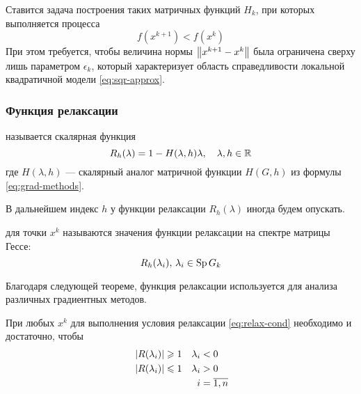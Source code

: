 Ставится задача построения таких матричных функций $H_k$, при которых
выполняется  процесса
\begin{equation}
  \label{eq:relax-cond}
  f(x^{k+1}) < f(x^k)
\end{equation}
При этом требуется, чтобы величина нормы $\left \lVert{x^{k+1}-x^{k}}\right \rVert$ была
ограничена сверху лишь параметром $\epsilon_k$, который характеризует
область справедливости локальной квадратичной модели
\eqref{eq:sqr-approx}.

\subsubsection{Функция релаксации}

\begin{dfn}
   называется скалярная функция
  \begin{equation}
    \label{eq:relax-fun}
    R_h(\lambda) = 1 - H(\lambda, h)\lambda,\quad \lambda,h \in \mathbb{R}
  \end{equation}
  где $H(\lambda, h)$ — скалярный аналог матричной функции $H(G, h)$
  из формулы \eqref{eq:grad-methods}.
\end{dfn}
В дальнейшем индекс $h$ у функции релаксации $R_h(\lambda)$ иногда
будем опускать.

\begin{dfn}
   для точки $x^k$ называются значения
  функции релаксации на спектре матрицы Гессе:
  \begin{equation}
    \label{eq:relax-fac}
    R_h(\lambda_i),\, \lambda_i \in \operatorname{Sp}{G_k}
  \end{equation}
\end{dfn}

Благодаря следующей теореме, функция релаксации используется для
анализа различных градиентных методов.

\begin{thm}
  \label{thm:relax-thm}
  При любых $x^k$ для выполнения условия релаксации
  \eqref{eq:relax-cond} необходимо и достаточно, чтобы
  \begin{equation}
    \label{eq:relax-thm}
    \begin{aligned}
      & \left \lvert{R(\lambda_i)}\right \rvert \geqslant 1 & \lambda_i& < 0 \\
      & \left \lvert{R(\lambda_i)}\right \rvert \leqslant 1 & \lambda_i& > 0\\
      &&i& = \overline{1, n}
    \end{aligned}
  \end{equation}
\end{thm}

